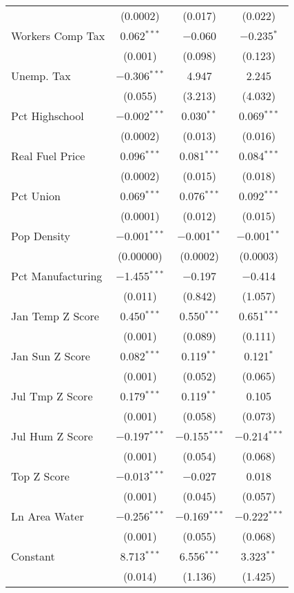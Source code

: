 \begin{table}[!htbp]
\begin{tabular}{@{\extracolsep{5pt}}lccc}
  & (0.0002) & (0.017) & (0.022) \\ 
  Workers Comp Tax & 0.062$^{***}$ & $-$0.060 & $-$0.235$^{*}$ \\ 
  & (0.001) & (0.098) & (0.123) \\ 
  Unemp. Tax & $-$0.306$^{***}$ & 4.947 & 2.245 \\ 
  & (0.055) & (3.213) & (4.032) \\ 
  Pct Highschool & $-$0.002$^{***}$ & 0.030$^{**}$ & 0.069$^{***}$ \\ 
  & (0.0002) & (0.013) & (0.016) \\ 
  Real Fuel Price & 0.096$^{***}$ & 0.081$^{***}$ & 0.084$^{***}$ \\ 
  & (0.0002) & (0.015) & (0.018) \\ 
  Pct Union & 0.069$^{***}$ & 0.076$^{***}$ & 0.092$^{***}$ \\ 
  & (0.0001) & (0.012) & (0.015) \\ 
  Pop Density & $-$0.001$^{***}$ & $-$0.001$^{**}$ & $-$0.001$^{**}$ \\ 
  & (0.00000) & (0.0002) & (0.0003) \\ 
  Pct Manufacturing & $-$1.455$^{***}$ & $-$0.197 & $-$0.414 \\ 
  & (0.011) & (0.842) & (1.057) \\ 
  Jan Temp Z Score & 0.450$^{***}$ & 0.550$^{***}$ & 0.651$^{***}$ \\ 
  & (0.001) & (0.089) & (0.111) \\ 
  Jan Sun Z Score & 0.082$^{***}$ & 0.119$^{**}$ & 0.121$^{*}$ \\ 
  & (0.001) & (0.052) & (0.065) \\ 
  Jul Tmp Z Score & 0.179$^{***}$ & 0.119$^{**}$ & 0.105 \\ 
  & (0.001) & (0.058) & (0.073) \\ 
  Jul Hum Z Score & $-$0.197$^{***}$ & $-$0.155$^{***}$ & $-$0.214$^{***}$ \\ 
  & (0.001) & (0.054) & (0.068) \\ 
  Top Z Score & $-$0.013$^{***}$ & $-$0.027 & 0.018 \\ 
  & (0.001) & (0.045) & (0.057) \\ 
  Ln Area Water & $-$0.256$^{***}$ & $-$0.169$^{***}$ & $-$0.222$^{***}$ \\ 
  & (0.001) & (0.055) & (0.068) \\ 
  Constant & 8.713$^{***}$ & 6.556$^{***}$ & 3.323$^{**}$ \\ 
  & (0.014) & (1.136) & (1.425) \\ 

\end{tabular}
\end{table}
